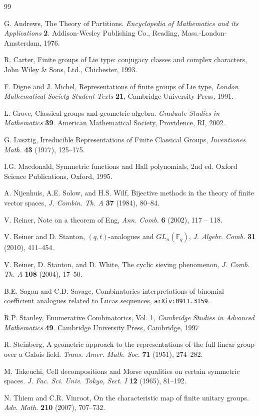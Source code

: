 \documentclass[10pt]{amsart}
\theoremstyle{plain}
\theoremstyle{definition}
\theoremstyle{remark}
\numberwithin{equation}{section}
\newcommand\FF{\mathbb{F}}
\begin{document}
\begin{thebibliography}{99}

 G. Andrews,
The Theory of Partitions.
{\it Encyclopedia of Mathematics and its Applications} {\bf 2}.
Addison-Wesley Publishing Co., Reading, Mass.-London-Amsterdam, 1976.


R. Carter,
Finite groups of Lie type: conjugacy classes and complex characters,
John Wiley \& Sons, Ltd., Chichester, 1993.

F. Digne and J. Michel, 
Representations of finite groups of Lie type,
{\it London Mathematical Society Student Texts} {\bf 21}, 
Cambridge University Press, 1991.

L. Grove,
Classical groups and geometric algebra.
{\it Graduate Studies in Mathematics} {\bf 39}. 
American Mathematical Society, Providence, RI, 2002. 

G. Lusztig,
Irreducible Representations of Finite Classical Groups,
{\it Inventiones Math.}  {\bf 43} (1977), 125--175.

I.G. Macdonald, 
Symmetric functions and Hall polynomials, 2nd ed.
Oxford Science Publications, Oxford, 1995.

 A. Nijenhuis, A.E. Solow, and H.S. Wilf,
Bijective methods in the theory of finite
vector spaces, {\it J. Combin. Th. A} {\bf 37} (1984), 80--84.

 V. Reiner,
Note on a theorem of Eng,
{\it Ann. Comb.} {\bf 6} (2002), 117 -- 118. 


  V. Reiner and D. Stanton, $(q,t)$-analogues and $GL_n(\FF_q)$,
{\it J. Algebr. Comb.} {\bf 31} (2010), 411--454.

 V. Reiner, D. Stanton, and D. White,
The cyclic sieving phenomenon,
{\it J. Comb. Th. A} {\bf 108} (2004), 17--50.

B.E. Sagan and C.D. Savage,
Combinatorics interpretations of binomial coefficient
analogues related to Lucas sequences,
{\tt arXiv:0911.3159}.


 R.P. Stanley,
Enumerative Combinatorics, Vol. 1,
{\it Cambridge Studies in Advanced Mathematics} {\bf 49}. 
Cambridge University Press, Cambridge, 1997

R. Steinberg,
A geometric approach to the representations of the full linear group 
over a Galois field.
{\it Trans. Amer. Math. Soc.} {\bf 71} (1951), 274--282. 


M. Takeuchi,
Cell decompositions and Morse equalities on certain symmetric spaces.
{\it J. Fac. Sci. Univ. Tokyo, Sect. I} {\bf 12} (1965), 81--192.

N. Thiem and C.R. Vinroot, 
On the characteristic map of finite unitary groups. 
{\it Adv. Math.} {\bf 210} (2007), 707--732. 
\end{thebibliography}



\end{document}
